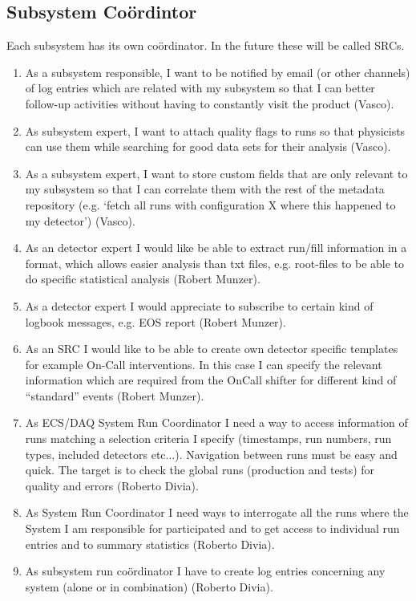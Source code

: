 \documentclass[a4paper,11pt]{book}
\begin{document}
\subsection{Subsystem Co\"ordintor}
Each subsystem has its own co\"ordinator. In the future these will be called SRCs.
\begin{enumerate}
  \item As a subsystem responsible, I want to be notified by email (or other channels) of log entries which are related with my subsystem so that I can better follow-up activities without having to constantly visit the product (Vasco). 
  \item As subsystem expert, I want to attach quality flags to runs so that physicists can use them while searching for good data sets for their analysis (Vasco). 
  \item As a subsystem expert, I want to store custom fields that are only relevant to my subsystem so that I can correlate them with the rest of the metadata repository (e.g. ‘fetch all runs with configuration X where this happened to my detector’) (Vasco). 
  \item As an detector expert I would like be able to extract run/fill information in a format, which allows easier
analysis than txt files, e.g. root-files to be able to do specific statistical analysis (Robert Munzer).
  \item As a detector expert I would appreciate to subscribe to certain kind of logbook messages, e.g. EOS report (Robert Munzer).
  \item As an SRC I would like to be able to create own detector specific templates for example On-Call interventions. In this case I can specify the relevant information which are required from the OnCall shifter for different kind of “standard” events (Robert Munzer).
  \item As ECS/DAQ System Run Coordinator I need a way to access information of runs matching a selection criteria I specify (timestamps, run numbers, run types, included detectors etc...). Navigation between runs must be easy and quick. The target is to check the global runs (production and tests) for quality and errors (Roberto Divia).
  \item As System Run Coordinator I need ways to interrogate all the runs where the System I am responsible for participated and to get access to individual run entries and to summary statistics (Roberto Divia).
  \item As subsystem run co\"ordinator I have to create log entries concerning any system (alone or in combination) (Roberto Divia).

\end{enumerate}
\end{document}
